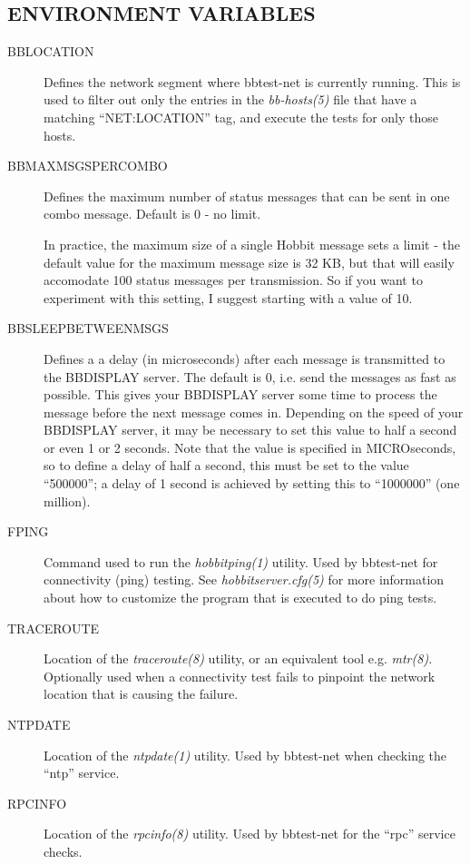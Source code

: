 \subsection{ENVIRONMENT VARIABLES}
\begin{description}
\item[BBLOCATION] Defines the network segment where bbtest-net is
  currently running. This is used to filter out only the entries in
  the \emph{bb-hosts(5)} file that have a matching ``NET:LOCATION''
  tag, and execute the tests for only those hosts. 


 

\item[BBMAXMSGSPERCOMBO] Defines the maximum number of status messages
  that can be sent in one combo message. Default is 0 - no limit.  

 In practice, the maximum size of a single Hobbit message sets a limit
 - the default value for the maximum message size is 32 KB, but that
 will easily accomodate 100 status messages per transmission. So if
 you want to experiment with this setting, I suggest starting with a
 value of 10. 



\item[BBSLEEPBETWEENMSGS] Defines a a delay (in microseconds) after
  each message is transmitted to the BBDISPLAY server. The default is
  0, i.e. send the messages as fast as possible. This gives your
  BBDISPLAY server some time to process the message before the next
  message comes in. Depending on the speed of your BBDISPLAY server,
  it may be necessary to set this value to half a second or even 1 or
  2 seconds. Note that the value is specified in MICROseconds, so to
  define a delay of half a second, this must be set to the value
  ``500000''; a delay of 1 second is achieved by setting this to
  ``1000000'' (one million). 


 

\item[FPING] Command used to run the \emph{hobbitping(1) }
  utility. Used by bbtest-net for connectivity (ping) testing. See
  \emph{hobbitserver.cfg(5)} for more information about how to
  customize the program that is executed to do ping tests. 


\item[TRACEROUTE] Location of the \emph{traceroute(8)} utility, or an
  equivalent tool e.g. \emph{mtr(8).} Optionally used when a
  connectivity test fails to pinpoint the network location that is
  causing the failure. 


 

\item[NTPDATE] Location of the \emph{ntpdate(1) }
 utility. Used by bbtest-net when checking the ``ntp'' service. 

 

\item[RPCINFO] Location of the \emph{rpcinfo(8) }
 utility. Used by bbtest-net for the ``rpc'' service checks. 

 


\end{description}
